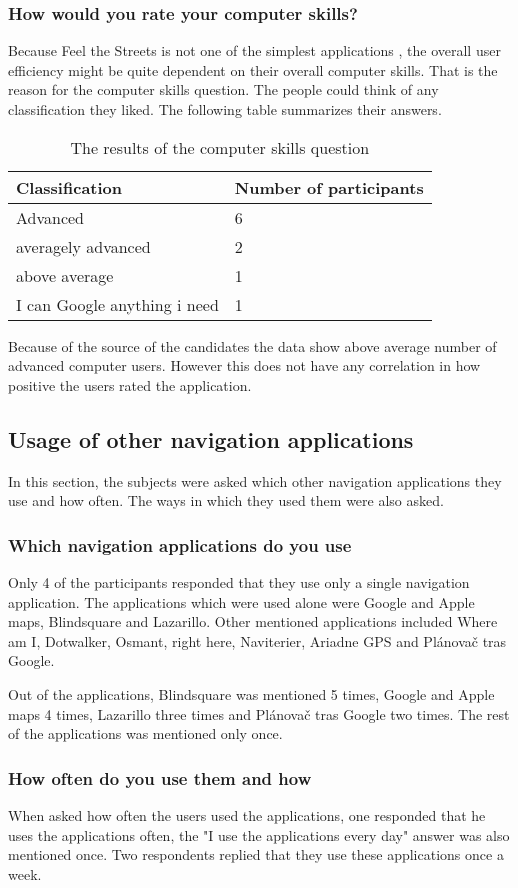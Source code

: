 \documentclass[nolof,digital]{fithesis3}
\begin{document}
\subsubsection{How would you rate your computer skills?}
Because Feel the Streets is not one of the simplest applications , the overall user efficiency might be quite dependent on their overall computer skills. That is the reason for the computer skills question. The people could think of any classification they liked. The following table summarizes their answers.
\begin{table}
\caption{The results of the computer skills question}
\begin{tabularx}{\textwidth}{ |X|X| }
Classification & Number of participants \\
\hline
Advanced & 6 \\
averagely advanced & 2 \\
above average & 1 \\
I can Google anything i need & 1 \\
\end{tabularx}
\end{table}
Because of the source of the candidates the data show above average number of advanced computer users. However this does not have any correlation in how positive the users rated the application.
\subsection{Usage of other navigation applications}
In this section, the subjects were asked which other navigation applications they use and how often. The ways in which they used them were also asked.
\subsubsection{Which navigation applications do you use}
Only 4 of the participants responded that they use only a single navigation application. The applications which were used alone were Google and Apple maps, Blindsquare and Lazarillo. Other mentioned applications included Where am I, Dotwalker, Osmant, right here, Naviterier, Ariadne GPS and Plánovač tras Google.

Out of the applications, Blindsquare was mentioned 5 times, Google and Apple maps 4 times, Lazarillo three times and Plánovač tras Google two times. The rest of the applications was mentioned only once.
\subsubsection{How often do you use them and how}
When asked how often the users used the applications, one responded that he uses the applications often, the "I use the applications every day" answer was also mentioned once. Two respondents replied that they use these applications once a week.
\end{document}

